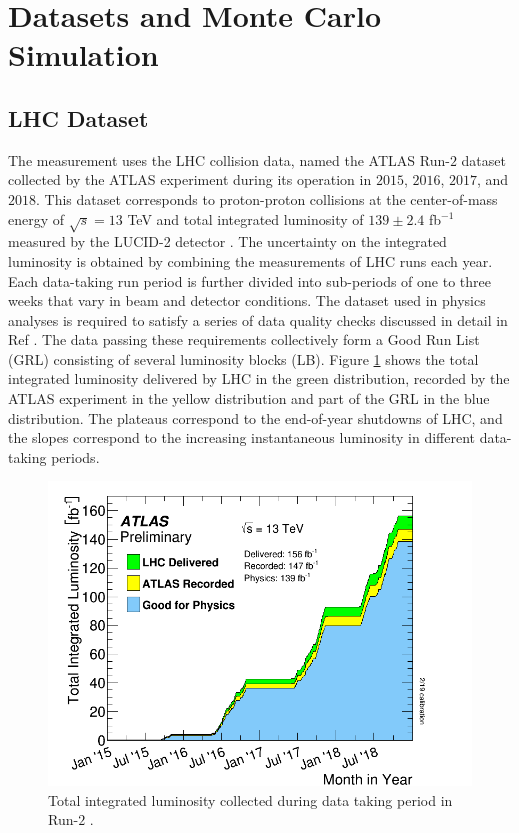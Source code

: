 \section{Datasets and Monte Carlo Simulation}
\label{sec:DataSetAndMonteCarlo}

\subsection{LHC Dataset}
\label{subsec:Dataset}

The measurement uses the LHC collision data, named the ATLAS Run-$2$ dataset collected by the ATLAS experiment during its operation in $2015$, $2016$, $2017$, and $2018$. This dataset corresponds to proton-proton collisions at the center-of-mass energy of $\sqrt{s} = 13$ TeV and total integrated luminosity of $139 \pm 2.4$ fb$^{-1}$ measured by the LUCID-2 detector \cite{ATLASLuminosityDetector}\cite{ATLASRun2IntegratedLumi}. The uncertainty on the integrated luminosity is obtained by combining the measurements of LHC runs each year. Each data-taking run period is further divided into sub-periods of one to three weeks that vary in beam and detector conditions. The dataset used in physics analyses is required to satisfy a series of data quality checks discussed in detail in Ref \cite{ATLASRun2DataTaking}. The data passing these requirements collectively form a Good Run List (GRL) consisting of several luminosity blocks (LB). Figure \ref{fig:InstLuminosity} shows the total integrated luminosity delivered by LHC in the green distribution, recorded by the ATLAS experiment in the yellow distribution and part of the GRL in the blue distribution. The plateaus correspond to the end-of-year shutdowns of LHC, and the slopes correspond to the increasing instantaneous luminosity in different data-taking periods. 

\begin{figure}
\centering
\includegraphics[width=.8\linewidth]{figures/AnalysisOverview/IntegratedLumiRun2.pdf}  
  \caption{Total integrated luminosity collected during data taking period in Run-$2$ \cite{ATLASRun2DataTaking}. }
\label{fig:InstLuminosity}
\end{figure}

